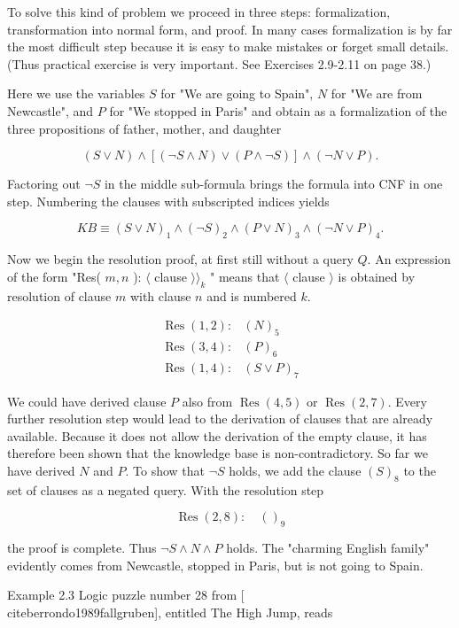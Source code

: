 \documentclass[10pt]{book}
\begin{document}
To solve this kind of problem we proceed in three steps: formalization, transformation into normal form, and proof. In many cases formalization is by far the most difficult step because it is easy to make mistakes or forget small details. (Thus practical exercise is very important. See Exercises 2.9-2.11 on page 38.)

Here we use the variables $S$ for "We are going to Spain", $N$ for "We are from Newcastle", and $P$ for "We stopped in Paris" and obtain as a formalization of the three propositions of father, mother, and daughter

$$
(S \vee N) \wedge[(\neg S \wedge N) \vee(P \wedge \neg S)] \wedge(\neg N \vee P) .
$$

Factoring out $\neg S$ in the middle sub-formula brings the formula into CNF in one step. Numbering the clauses with subscripted indices yields

$$
K B \equiv(S \vee N)_{1} \wedge(\neg S)_{2} \wedge(P \vee N)_{3} \wedge(\neg N \vee P)_{4} .
$$

Now we begin the resolution proof, at first still without a query $Q$. An expression of the form "Res( $m, n$ ): $\langle$ clause $\rangle\rangle_{k}$ " means that $\langle$ clause $\rangle$ is obtained by resolution of clause $m$ with clause $n$ and is numbered $k$.

$$
\begin{array}{ll}
\operatorname{Res}(1,2): & (N)_{5} \\
\operatorname{Res}(3,4): & (P)_{6} \\
\operatorname{Res}(1,4): & (S \vee P)_{7}
\end{array}
$$

We could have derived clause $P$ also from $\operatorname{Res}(4,5)$ or $\operatorname{Res}(2,7)$. Every further resolution step would lead to the derivation of clauses that are already available. Because it does not allow the derivation of the empty clause, it has therefore been shown that the knowledge base is non-contradictory. So far we have derived $N$ and $P$. To show that $\neg S$ holds, we add the clause $(S)_{8}$ to the set of clauses as a negated query. With the resolution step

$$
\operatorname{Res}(2,8): \quad()_{9}
$$

the proof is complete. Thus $\neg S \wedge N \wedge P$ holds. The "charming English family" evidently comes from Newcastle, stopped in Paris, but is not going to Spain.

Example 2.3 Logic puzzle number 28 from [\\cite{berrondo1989fallgruben}], entitled The High Jump, reads\\
\end{document}
